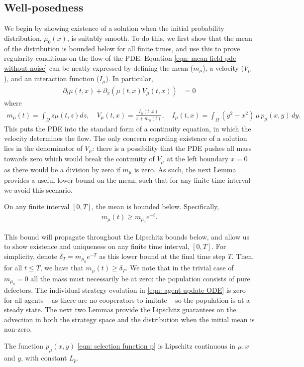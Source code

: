 \documentclass[10pt]{article}
\begin{document}
\subsection{Well-posedness}
We begin by showing existence of a solution when the initial probability distribution, $\mu_0(x)$, is suitably smooth. To do this, we first show that the mean of the distribution is bounded below for all finite times, and use this to prove regularity conditions on the flow of the PDE. Equation \eqref{eqn: mean field pde without noise} can be neatly expressed by defining the mean ($m_\mu$), a velocity ($V_\mu$), and an interaction function ($I_\mu$). In particular, 
    \begin{align}
    \partial_t\mu(t,x) +\partial_x (\mu(t,x) V_\mu(t,x)) &= 0
    \end{align}
    where 
    \begin{align*}
        m_\mu(t) = \int_\Omega z \mu(t,z) dz,\quad 
        V_\mu(t,x) = \frac{I_\mu(t,x)}{x+ m_\mu(t)}, \quad  I_\mu(t,x) = \int_{\Omega} (y^2-x^2)\,\mu\,p_\mu(x,y)\,dy.
    \end{align*}
This puts the PDE into the standard form of a continuity equation, in which the velocity determines the flow. The only concern regarding existence of a solution lies in the denominator of $V_\mu$: there is a possibility that the PDE pushes all mass towards zero which would break the continuity of $V_\mu$ at the left boundary $x=0$ as there would be a division by zero if $m_\mu$ is zero. As such, the next Lemma provides a useful lower bound on the mean, such that for any finite time interval we avoid this scenario. 
\begin{lemma}\label{lem: mean bounded below}
    On any finite interval $[0,T]$, the mean is bounded below. Specifically,
    \begin{align*}
        m_\mu(t) \geq m_{\mu_0}e^{-{t}}.
    \end{align*}
\end{lemma}
This bound will propagate throughout the Lipschitz bounds below, and allow us to show existence and uniqueness on any finite time interval, $[0,T]$. For simplicity, denote $\delta_T=m_{\mu_0}e^{-T}$ as this lower bound at the final time step $T$. Then, for all $t\leq T$, we have that 
$m_\mu(t) \geq \delta_T$. We note that in the trivial case of $m_{\mu_0}=0$ all the mass must necessarily be at zero: the population consists of pure defectors. The individual strategy evolution in \eqref{eqn: agent update ODE} is zero for all agents -- as there are no cooperators to imitate -- so the population is at a steady state. The next two Lemmas provide the Lipschitz guarantees on the advection in both the strategy space and the distribution when the initial mean is non-zero.
\begin{lemma}\label{lem: p is Lipschitz W_1}
    The function $p_{\mu}(x,y)$ \eqref{eqn: selection function p} is Lipschitz continuous in $\mu, x$ and $y$, with constant $L_p$. 
\end{lemma}
\end{document}
